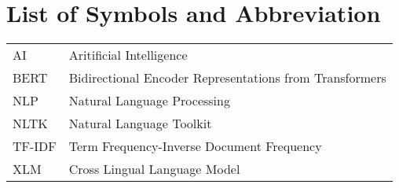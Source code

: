 				\chapter*{List of Symbols and Abbreviation}
			\endgroup
   
		\normalsize
		\begin{tabular}{p{1in}p{5in}} 
			AI & Aritificial Intelligence\\
			BERT & Bidirectional Encoder Representations from Transformers\\
			NLP & Natural Language Processing\\
			NLTK & Natural Language Toolkit\\
			TF-IDF & Term Frequency-Inverse Document Frequency\\
			XLM & Cross Lingual Language Model\\
			\end{tabular}





		\break
		\pagebreak
		
	
